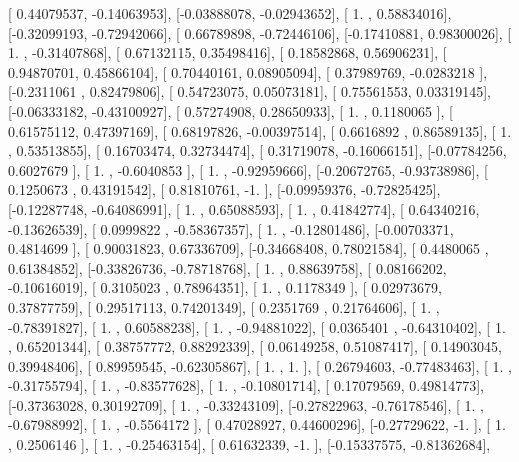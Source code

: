 \documentclass{article}
\begin{document}
       [ 0.44079537, -0.14063953],
       [-0.03888078, -0.02943652],
       [ 1.        ,  0.58834016],
       [-0.32099193, -0.72942066],
       [ 0.66789898, -0.72446106],
       [-0.17410881,  0.98300026],
       [ 1.        , -0.31407868],
       [ 0.67132115,  0.35498416],
       [ 0.18582868,  0.56906231],
       [ 0.94870701,  0.45866104],
       [ 0.70440161,  0.08905094],
       [ 0.37989769, -0.0283218 ],
       [-0.2311061 ,  0.82479806],
       [ 0.54723075,  0.05073181],
       [ 0.75561553,  0.03319145],
       [-0.06333182, -0.43100927],
       [ 0.57274908,  0.28650933],
       [ 1.        ,  0.1180065 ],
       [ 0.61575112,  0.47397169],
       [ 0.68197826, -0.00397514],
       [ 0.6616892 ,  0.86589135],
       [ 1.        ,  0.53513855],
       [ 0.16703474,  0.32734474],
       [ 0.31719078, -0.16066151],
       [-0.07784256,  0.6027679 ],
       [ 1.        , -0.6040853 ],
       [ 1.        , -0.92959666],
       [-0.20672765, -0.93738986],
       [ 0.1250673 ,  0.43191542],
       [ 0.81810761, -1.        ],
       [-0.09959376, -0.72825425],
       [-0.12287748, -0.64086991],
       [ 1.        ,  0.65088593],
       [ 1.        ,  0.41842774],
       [ 0.64340216, -0.13626539],
       [ 0.0999822 , -0.58367357],
       [ 1.        , -0.12801486],
       [-0.00703371,  0.4814699 ],
       [ 0.90031823,  0.67336709],
       [-0.34668408,  0.78021584],
       [ 0.4480065 ,  0.61384852],
       [-0.33826736, -0.78718768],
       [ 1.        ,  0.88639758],
       [ 0.08166202, -0.10616019],
       [ 0.3105023 ,  0.78964351],
       [ 1.        ,  0.1178349 ],
       [ 0.02973679,  0.37877759],
       [ 0.29517113,  0.74201349],
       [ 0.2351769 ,  0.21764606],
       [ 1.        , -0.78391827],
       [ 1.        ,  0.60588238],
       [ 1.        , -0.94881022],
       [ 0.0365401 , -0.64310402],
       [ 1.        ,  0.65201344],
       [ 0.38757772,  0.88292339],
       [ 0.06149258,  0.51087417],
       [ 0.14903045,  0.39948406],
       [ 0.89959545, -0.62305867],
       [ 1.        ,  1.        ],
       [ 0.26794603, -0.77483463],
       [ 1.        , -0.31755794],
       [ 1.        , -0.83577628],
       [ 1.        , -0.10801714],
       [ 0.17079569,  0.49814773],
       [-0.37363028,  0.30192709],
       [ 1.        , -0.33243109],
       [-0.27822963, -0.76178546],
       [ 1.        , -0.67988992],
       [ 1.        , -0.5564172 ],
       [ 0.47028927,  0.44600296],
       [-0.27729622, -1.        ],
       [ 1.        ,  0.2506146 ],
       [ 1.        , -0.25463154],
       [ 0.61632339, -1.        ],
       [-0.15337575, -0.81362684],
\end{document}

